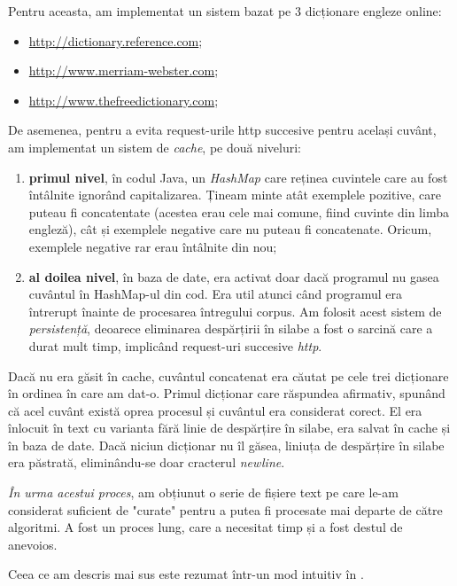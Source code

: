 Pentru aceasta, am implementat un sistem bazat pe 3 dicționare engleze online:

\begin{itemize}
\item \url{http://dictionary.reference.com};
\item \url{http://www.merriam-webster.com};
\item \url{http://www.thefreedictionary.com};
\end{itemize}

De asemenea, pentru a evita request-urile http succesive pentru același cuvânt, am implementat un sistem de \textit{cache}, pe două niveluri:

\begin{enumerate}
\item \textbf{primul nivel}, în codul Java, un \textit{HashMap} care reținea cuvintele care au fost întâlnite ignorând capitalizarea. Țineam minte atât exemplele pozitive, care puteau fi concatentate (acestea erau cele mai comune, fiind cuvinte din limba engleză), cât și exemplele negative care nu puteau fi concatenate. Oricum, exemplele negative rar erau întâlnite din nou;
\item \textbf{al doilea nivel}, în baza de date, era activat doar dacă programul nu gasea cuvântul în HashMap-ul din cod. Era util atunci când programul era întrerupt înainte de procesarea întregului corpus. Am folosit acest sistem de \textit{persistență}, deoarece eliminarea despărțirii în silabe a fost o sarcină care a durat mult timp, implicând request-uri succesive \textit{http}. 

\end{enumerate}

Dacă nu era găsit în cache, cuvântul concatenat era căutat pe cele trei dicționare în ordinea în care am dat-o. Primul dicționar care răspundea afirmativ, spunând că acel cuvânt există oprea procesul și cuvântul era considerat corect. El era înlocuit în text cu varianta fără linie de despărțire în silabe, era salvat în cache și în baza de date. Dacă niciun dicționar nu îl găsea, liniuța de despărțire în silabe era păstrată, eliminându-se doar cracterul \textit{newline}.

\textit{În urma acestui proces}, am obțiunut o serie de fișiere text pe care le-am considerat suficient de "curate" pentru a putea fi procesate mai departe de către algoritmi. A fost un proces lung, care a necesitat timp și a fost destul de anevoios.

Ceea ce am descris mai sus este rezumat într-un mod intuitiv în . 


